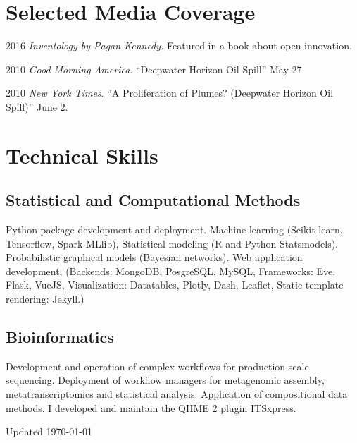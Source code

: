 \documentclass[12pt,letterpaper]{report}
\newcommand{\listitemspace}{0.15em}
\renewenvironment{itemize}
{\begin{list}{}{\setlength{\leftmargin}{0em}
            \setlength{\parskip}{0em}
            \setlength{\itemsep}{\listitemspace}
            \setlength{\parsep}{\listitemspace}}}
    {\end{list}}
\begin{document}
    \section*{Selected Media Coverage}

    \begin{tablist}
        \item[2016] \tab \textit{Inventology by Pagan Kennedy.} Featured in a book about open innovation.
        \item[2010] \tab \textit{Good Morning America}.  \enquote{Deepwater Horizon Oil Spill}  May 27.

        \item[2010] \tab \textit{New York Times}. \enquote{A Proliferation of Plumes? (Deepwater Horizon Oil Spill)}  June 2.
        


    \end{tablist}



    \section*{Technical Skills}

    \subsection*{Statistical and Computational Methods}

    \begin{itemize}

        \item Python package development and deployment. Machine learning (Scikit-learn, Tensorflow, Spark MLlib), Statistical modeling (R and Python Statsmodels). Probabilistic graphical models (Bayesian networks). Web application development, (Backends: MongoDB, PosgreSQL, MySQL, Frameworks: Eve, Flask, VueJS, Visualization: Datatables, Plotly, Dash, Leaflet, Static template rendering: Jekyll.)
        

    \end{itemize}

    \subsection*{Bioinformatics}

    \begin{itemize}

        \item Development and operation of complex workflows for production-scale sequencing. Deployment of workflow managers for metagenomic assembly, metatranscriptomics and statistical analysis. Application of compositional data methods. I developed and maintain the QIIME 2 plugin ITSxpress.

    \end{itemize}



    \begin{center}
        \vspace{6em}
        \vfill
        Updated \monthyeardate\today
    \end{center}
\end{document}
